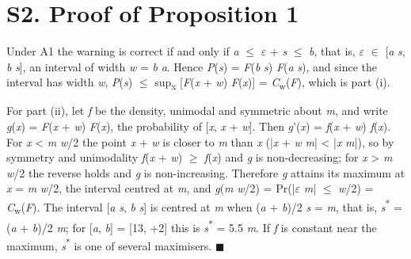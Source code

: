 \documentclass[11pt,a4paper]{article}
\begin{document}
\section*{S2. Proof of Proposition 1}

\noindent Under A1 the warning is correct if and only if \textit{a} $\le$ $\varepsilon$ + \textit{s} $\le$ \textit{b}, that is, $\varepsilon$ $\in$ [\textit{a} \textminus{} \textit{s}, \textit{b} \textminus{} \textit{s}], an interval of width \textit{w} = \textit{b} \textminus{} \textit{a}. Hence \textit{P}(\textit{s}) = \textit{F}(\textit{b} \textminus{} \textit{s}) \textminus{} \textit{F}(\textit{a} \textminus{} \textit{s}), and since the interval has width \textit{w}, \textit{P}(\textit{s}) $\le$ sup\textsubscript{x} [\textit{F}(\textit{x} + \textit{w}) \textminus{} \textit{F}(\textit{x})] = \textit{C}\textsubscript{w}(\textit{F}), which is part (i).

\noindent For part (ii), let \textit{f} be the density, unimodal and symmetric about \textit{m}, and write \textit{g}(\textit{x}) = \textit{F}(\textit{x} + \textit{w}) \textminus{} \textit{F}(\textit{x}), the probability of [\textit{x}, \textit{x} + \textit{w}]. Then \textit{g}'(\textit{x}) = \textit{f}(\textit{x} + \textit{w}) \textminus{} \textit{f}(\textit{x}). For \textit{x} < \textit{m} \textminus{} \textit{w}/2 the point \textit{x} + \textit{w} is closer to \textit{m} than \textit{x} (|\textit{x} + \textit{w} \textminus{} \textit{m}| < |\textit{x} \textminus{} \textit{m}|), so by symmetry and unimodality \textit{f}(\textit{x} + \textit{w}) $\ge$ \textit{f}(\textit{x}) and \textit{g} is non-decreasing; for \textit{x} > \textit{m} \textminus{} \textit{w}/2 the reverse holds and \textit{g} is non-increasing. Therefore \textit{g} attains its maximum at \textit{x} = \textit{m} \textminus{} \textit{w}/2, the interval centred at \textit{m}, and \textit{g}(\textit{m} \textminus{} \textit{w}/2) = Pr(|$\varepsilon$ \textminus{} \textit{m}| $\le$ \textit{w}/2) = \textit{C}\textsubscript{w}(\textit{F}). The interval [\textit{a} \textminus{} \textit{s}, \textit{b} \textminus{} \textit{s}] is centred at \textit{m} when (\textit{a} + \textit{b})/2 \textminus{} \textit{s} = \textit{m}, that is, \textit{s}\textsuperscript{*} = (\textit{a} + \textit{b})/2 \textminus{} \textit{m}; for [\textit{a}, \textit{b}] = [\textminus{}13, +2] this is \textit{s}\textsuperscript{*} = \textminus{}5.5 \textminus{} \textit{m}. If \textit{f} is constant near the maximum, \textit{s}\textsuperscript{*} is one of several maximisers. \hfill$\blacksquare$
\end{document}
